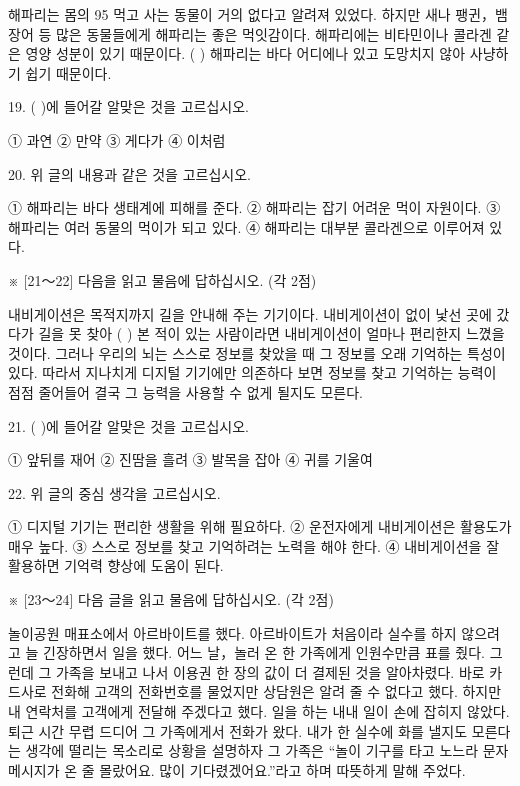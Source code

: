 \documentclass[12pt]{article}
\begin{document}
\begin{enumerate}[1.]
  해파리는 몸의 95%
먹고 사는 동물이 거의 없다고 알려져 있었다. 하지만 새나 팽귄，뱀장어
등 많은 동물들에게 해파리는 좋은 먹잇감이다. 해파리에는 비타민이나
콜라겐 같은 영양 성분이 있기 때문이다. (      ) 해파리는 바다 어디에나
있고 도망치지 않아 사냥하기 쉽기 때문이다.


19. (   )에 들어갈 알맞은 것을 고르십시오.

① 과연	② 만약	③ 게다가	④ 이처럼


20. 위 글의 내용과 같은 것을 고르십시오.

① 해파리는 바다 생태계에 피해를 준다.
② 해파리는 잡기 어려운 먹이 자원이다.
③ 해파리는 여러 동물의 먹이가 되고 있다.
④ 해파리는 대부분 콜라겐으로 이루어져 있다.




※ [21～22] 다음을 읽고 물음에 답하십시오. (각 2점)

  내비게이션은 목적지까지 길을 안내해 주는 기기이다. 내비게이션이
없이 낯선 곳에 갔다가 길을 못 찾아 (    ) 본 적이 있는
사람이라면 내비게이션이 얼마나 편리한지 느꼈을 것이다. 그러나 우리의
뇌는 스스로 정보를 찾았을 때 그 정보를 오래 기억하는 특성이 있다.
따라서 지나치게 디지털 기기에만 의존하다 보면 정보를 찾고 기억하는
능력이 점점 줄어들어 결국 그 능력을 사용할 수 없게 될지도 모른다.


21. (   )에 들어갈 알맞은 것을 고르십시오.

① 앞뒤를 재어
② 진땀을 흘려
③ 발목을 잡아
④ 귀를 기울여


22. 위 글의 중심 생각을 고르십시오.

① 디지털 기기는 편리한 생활을 위해 필요하다.
② 운전자에게 내비게이션은 활용도가 매우 높다.
③ 스스로 정보를 찾고 기억하려는 노력을 해야 한다.
④ 내비게이션을 잘 활용하면 기억력 향상에 도움이 된다.




※ [23～24] 다음 글을 읽고 물음에 답하십시오. (각 2점)

  놀이공원 매표소에서 아르바이트를 했다. 아르바이트가 처음이라 실수를
하지 않으려고 늘 긴장하면서 일을 했다. 어느 날，놀러 온 한 가족에게
인원수만큼 표를 줬다. 그런데 그 가족을 보내고 나서 이용권 한 장의 값이
더 결제된 것을 알아차렸다. 바로 카드사로 전화해 고객의 전화번호를
물었지만 상담원은 알려 줄 수 없다고 했다. 하지만 내 연락처를 고객에게
전달해 주겠다고 했다. 일을 하는 내내 일이 손에 잡히지 않았다. 퇴근
시간 무렵 드디어 그 가족에게서 전화가 왔다. 내가 한 실수에 화를 낼지도
모른다는 생각에 떨리는 목소리로 상황을 설명하자 그 가족은 “놀이 기구를
타고 노느라 문자 메시지가 온 줄 몰랐어요. 많이 기다렸겠어요.”라고 하며
따뜻하게 말해 주었다.



\end{enumerate}
\end{document}
